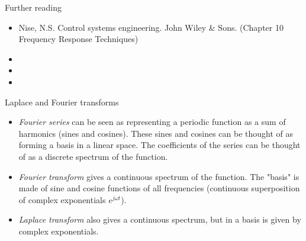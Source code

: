 \documentclass{beamer}
\begin{document}
\begin{frame}{Further reading}

\begin{itemize}
	
	
\item Nise, N.S. Control systems engineering. John Wiley \& Sons. (Chapter 10 Frequency Response Techniques)	
	

\item {}	
	
	
\item {}

\item {}


\end{itemize}

\end{frame}




\myqrframe




\begin{frame}{Laplace and Fourier transforms}
	\begin{flushleft}
		
		\begin{itemize}
			\item \emph{Fourier series} can be seen as representing a periodic function as a sum of harmonics (sines and cosines). These sines and cosines can be thought of as forming a basis in a linear space. The coefficients of the series can be thought of as a discrete spectrum of the function.
			
			\item \emph{Fourier transform} gives a continuous spectrum of the function. The "basis" is made of sine and cosine functions of all frequencies (continuous superposition of complex exponentials $e^{j \omega t}$).
			
			\item \emph{Laplace transform} also gives a continuous spectrum, but in a basis is given by complex exponentials.
		\end{itemize}
		
	\end{flushleft}
\end{frame}
\end{document}
